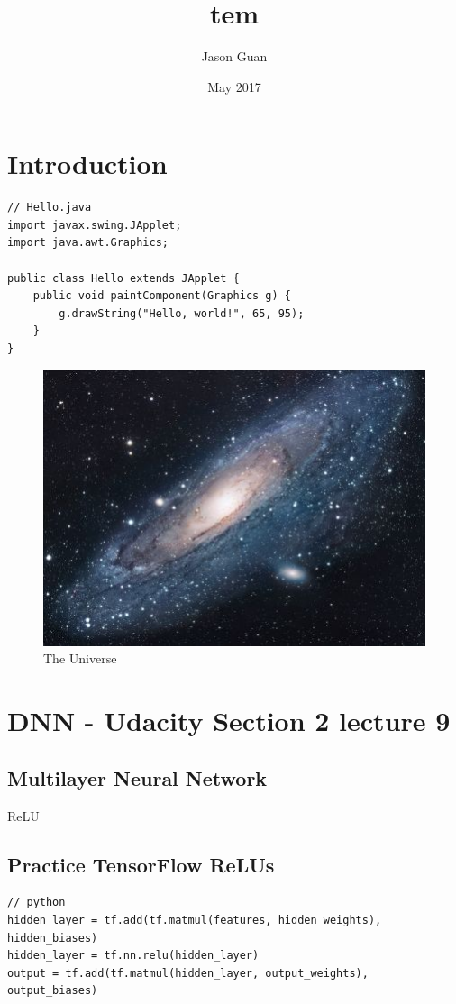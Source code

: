 \documentclass{article}
\title{tem}
\author{Jason Guan }
\date{May 2017}
\begin{document}
\maketitle

\section{Introduction}

\begin{lstlisting}
// Hello.java
import javax.swing.JApplet;
import java.awt.Graphics;

public class Hello extends JApplet {
    public void paintComponent(Graphics g) {
        g.drawString("Hello, world!", 65, 95);
    }    
}
\end{lstlisting}

\begin{figure}[h!]
\centering
\includegraphics[scale=1.7]{universe.jpg}
\caption{The Universe}
\label{fig:univerise}
\end{figure}

\section{DNN - Udacity Section 2 lecture 9}
\subsection{Multilayer Neural Network}
ReLU
\subsection{Practice TensorFlow ReLUs}

\begin{lstlisting}
// python
hidden_layer = tf.add(tf.matmul(features, hidden_weights), hidden_biases)
hidden_layer = tf.nn.relu(hidden_layer)
output = tf.add(tf.matmul(hidden_layer, output_weights), output_biases)
\end{lstlisting}
\end{document}
